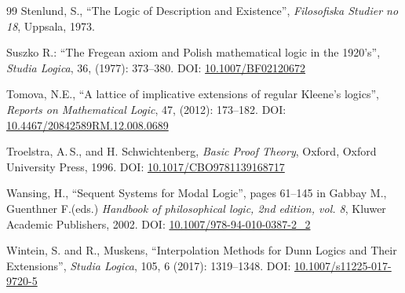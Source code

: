 \documentclass[10pt,a4paper]{article}
\theoremstyle{definition}
\newcommand{\3}{\vspace{.3in}}
\newcommand{\2}{\vspace{.2in}}
\newcommand{\1}{\vspace{.1in}}
\newcommand{\5}{\vspace{.05in}}
\newcommand\DOI[2]{DOI: \href{#1#2}{#2}}
\newcommand{\ts}{\,}
\begin{document}
\begin{thebibliography}{99}
Stenlund, S., ``The Logic of Description and Existence'', \textit{Filosofiska Studier no 18}, Uppsala, 1973.

Suszko R.:  ``The Fregean axiom and Polish mathematical logic in the 1920's'', \textit{Studia Logica}, 36, (1977): 373--380.
\DOI{http://dx.doi.org/}{10.1007/BF02120672}

Tomova, N.E.,  ``A lattice of implicative extensions of regular Kleene's logics'',  \textit{Reports on Mathematical Logic}, 47,  (2012): 173--182.
\DOI{http://dx.doi.org/}{10.4467/20842589RM.12.008.0689}

Troelstra, A.\ts S., and H. Schwichtenberg, \textit{Basic Proof Theory}, Oxford, 
Oxford University Press, 1996.
\DOI{http://dx.doi.org/}{10.1017/CBO9781139168717}

Wansing, H., ``Sequent Systems for Modal Logic'', pages 61--145 in Gabbay M., Guenthner F.(eds.) \textit{Handbook of philosophical logic, 2nd edition, vol. 8}, Kluwer Academic Publishers, 2002. 
\DOI{http://dx.doi.org/}{10.1007/978-94-010-0387-2\_2}

Wintein, S. and R., Muskens, ``Interpolation Methods for Dunn Logics and Their Extensions'',  \textit{Studia Logica}, 105, 6 (2017): 1319--1348.
\DOI{http://dx.doi.org/}{10.1007/s11225-017-9720-5}
\end{thebibliography}
\end{document}
